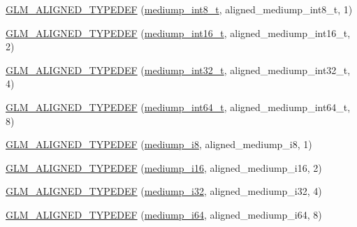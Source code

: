 \begin{DoxyCompactItemize}
\item 
\hyperlink{group__gtx__type__aligned_ga353fd9fa8a9ad952fcabd0d53ad9a6dd}{G\+L\+M\+\_\+\+A\+L\+I\+G\+N\+E\+D\+\_\+\+T\+Y\+P\+E\+D\+E\+F} (\hyperlink{group__gtc__type__precision_ga626ac5f73d3538e62a879d6c56abfb36}{mediump\+\_\+int8\+\_\+t}, aligned\+\_\+mediump\+\_\+int8\+\_\+t, 1)
\item 
\hyperlink{group__gtx__type__aligned_ga2196442c0e5c5e8c77842de388c42521}{G\+L\+M\+\_\+\+A\+L\+I\+G\+N\+E\+D\+\_\+\+T\+Y\+P\+E\+D\+E\+F} (\hyperlink{group__gtc__type__precision_ga478fab608cf43040013d719a3e03b194}{mediump\+\_\+int16\+\_\+t}, aligned\+\_\+mediump\+\_\+int16\+\_\+t, 2)
\item 
\hyperlink{group__gtx__type__aligned_ga1284488189daf897cf095c5eefad9744}{G\+L\+M\+\_\+\+A\+L\+I\+G\+N\+E\+D\+\_\+\+T\+Y\+P\+E\+D\+E\+F} (\hyperlink{group__gtc__type__precision_gafd9b4bd9e4465aec63351b59100692c4}{mediump\+\_\+int32\+\_\+t}, aligned\+\_\+mediump\+\_\+int32\+\_\+t, 4)
\item 
\hyperlink{group__gtx__type__aligned_ga73fdc86a539808af58808b7c60a1c4d8}{G\+L\+M\+\_\+\+A\+L\+I\+G\+N\+E\+D\+\_\+\+T\+Y\+P\+E\+D\+E\+F} (\hyperlink{group__gtc__type__precision_ga555a2f85641550c232db473a9bb981f7}{mediump\+\_\+int64\+\_\+t}, aligned\+\_\+mediump\+\_\+int64\+\_\+t, 8)
\item 
\hyperlink{group__gtx__type__aligned_gafafeea923e1983262c972e2b83922d3b}{G\+L\+M\+\_\+\+A\+L\+I\+G\+N\+E\+D\+\_\+\+T\+Y\+P\+E\+D\+E\+F} (\hyperlink{group__gtc__type__precision_ga28a8b5fd51072680bb55178c17cc7411}{mediump\+\_\+i8}, aligned\+\_\+mediump\+\_\+i8, 1)
\item 
\hyperlink{group__gtx__type__aligned_ga4b35ca5fe8f55c9d2fe54fdb8d8896f4}{G\+L\+M\+\_\+\+A\+L\+I\+G\+N\+E\+D\+\_\+\+T\+Y\+P\+E\+D\+E\+F} (\hyperlink{group__gtc__type__precision_ga8454fc6a82c7bb787d0ac9663e08f63d}{mediump\+\_\+i16}, aligned\+\_\+mediump\+\_\+i16, 2)
\item 
\hyperlink{group__gtx__type__aligned_ga63b882e29170d428463d99c3d630acc6}{G\+L\+M\+\_\+\+A\+L\+I\+G\+N\+E\+D\+\_\+\+T\+Y\+P\+E\+D\+E\+F} (\hyperlink{group__gtc__type__precision_ga5e00ec824eb55968a6b6496f294d8c07}{mediump\+\_\+i32}, aligned\+\_\+mediump\+\_\+i32, 4)
\item 
\hyperlink{group__gtx__type__aligned_ga8b20507bb048c1edea2d441cc953e6f0}{G\+L\+M\+\_\+\+A\+L\+I\+G\+N\+E\+D\+\_\+\+T\+Y\+P\+E\+D\+E\+F} (\hyperlink{group__gtc__type__precision_ga90fedf6c701ffbe00535156715e50787}{mediump\+\_\+i64}, aligned\+\_\+mediump\+\_\+i64, 8)
\item 

\end{DoxyCompactItemize}
